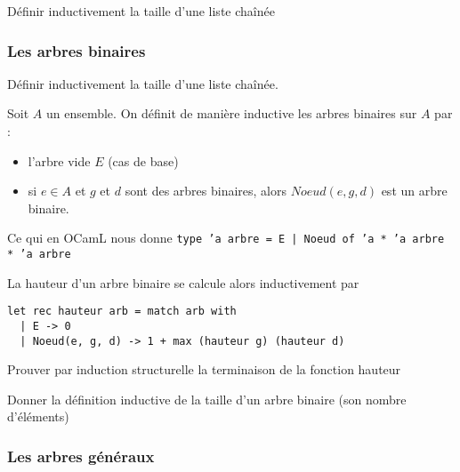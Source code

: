 \begin{exercise}
	Définir inductivement la taille d'une liste chaînée
\end{exercise}

\subsubsection{Les arbres binaires}

\begin{exercise}
	Définir inductivement la taille d'une liste chaînée.
\end{exercise}

\begin{definition}
	Soit $A$ un ensemble. On définit de manière inductive les arbres binaires sur $A$ par : \begin{itemize}
		\item l'arbre vide $E$ (cas de base)
		\item si $e\in A$ et $g$ et $d$ sont des arbres binaires, alors $Noeud(e,g,d)$ est un arbre binaire.
	\end{itemize}
\end{definition}

\begin{impl}
	Ce qui en OCamL nous donne \texttt{type 'a arbre = E | Noeud of 'a * 'a arbre * 'a arbre}
\end{impl}

\begin{example}
	La hauteur d'un arbre binaire se calcule alors inductivement par \begin{lstlisting}
let rec hauteur arb = match arb with
  | E -> 0
  | Noeud(e, g, d) -> 1 + max (hauteur g) (hauteur d)
	\end{lstlisting}
\end{example}

\begin{exercise}
	Prouver par induction structurelle la terminaison de la fonction hauteur
\end{exercise}

\begin{exercise}
	Donner la définition inductive de la taille d'un arbre binaire (son nombre d'éléments)
\end{exercise}

\subsubsection{Les arbres généraux}

